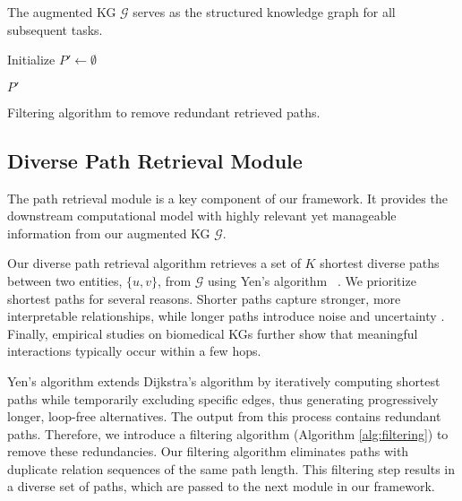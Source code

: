 The augmented KG \(\mathcal{G}\) serves as the structured knowledge graph for all subsequent tasks.



\begin{algorithm}[!ht]

\BlankLine
Initialize $P' \leftarrow \emptyset$\;

\Return $P'$
\caption{Filtering algorithm to remove redundant retrieved paths.}
\label{alg:filtering}
\end{algorithm}


\subsection{Diverse Path Retrieval Module}
The path retrieval module is a key component of our framework.
It provides the downstream computational model with highly relevant yet manageable information from our augmented KG $\mathcal{G}$.

Our diverse path retrieval algorithm retrieves a set of $K$ shortest diverse paths between two entities, \( \{u, v\} \), from $\mathcal{G}$ using Yen's algorithm ~\cite {yen1971finding}.
We prioritize shortest paths for several reasons. 
Shorter paths capture stronger, more interpretable relationships, while longer paths introduce noise and uncertainty \cite{liben2003link, barabasi2004network}. 
Finally, empirical studies on biomedical KGs further show that meaningful interactions typically occur within a few hops\cite{zitnik2018modeling, himmelstein2016pharmacotherapydb}.

Yen's algorithm extends Dijkstra's algorithm \cite{dijkstra1959note} by iteratively computing shortest paths while temporarily excluding specific edges, thus generating progressively longer, loop-free alternatives.
The output from this process contains redundant paths. 
Therefore, we introduce a filtering algorithm (Algorithm \ref{alg:filtering}) to remove these redundancies.
Our filtering algorithm eliminates paths with duplicate relation sequences of the same path length.
This filtering step results in a diverse set of paths, which are passed to the next module in our framework. 

